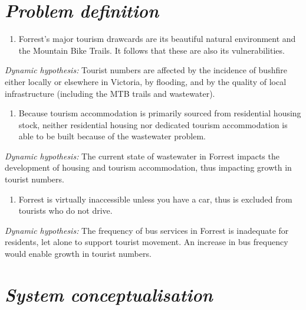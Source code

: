 \documentclass[
  11pt,
]{book}
\providecommand{\tightlist}{%
  \setlength{\itemsep}{0pt}\setlength{\parskip}{0pt}}
\begin{document}
\hypertarget{problem-definition-4}{%
\section{\texorpdfstring{\emph{Problem definition}}{Problem definition}}\label{problem-definition-4}}

\begin{enumerate}
\def\labelenumi{\arabic{enumi}.}
\tightlist
\item
  Forrest's major tourism drawcards are its beautiful natural environment and the Mountain Bike Trails. It follows that these are also its vulnerabilities.
\end{enumerate}

\emph{Dynamic hypothesis:}
Tourist numbers are affected by the incidence of bushfire either locally or elsewhere in Victoria, by flooding, and by the quality of local infrastructure (including the MTB trails and wastewater).

\begin{enumerate}
\def\labelenumi{\arabic{enumi}.}
\setcounter{enumi}{1}
\tightlist
\item
  Because tourism accommodation is primarily sourced from residential housing stock, neither residential housing nor dedicated tourism accommodation is able to be built because of the wastewater problem.
\end{enumerate}

\emph{Dynamic hypothesis:}
The current state of wastewater in Forrest impacts the development of housing and tourism accommodation, thus impacting growth in tourist numbers.

\begin{enumerate}
\def\labelenumi{\arabic{enumi}.}
\setcounter{enumi}{2}
\tightlist
\item
  Forrest is virtually inaccessible unless you have a car, thus is excluded from tourists who do not drive.
\end{enumerate}

\emph{Dynamic hypothesis:}
The frequency of bus services in Forrest is inadequate for residents, let alone to support tourist movement. An increase in bus frequency would enable growth in tourist numbers.

\hypertarget{system-conceptualisation-2}{%
\section{\texorpdfstring{\emph{System conceptualisation}}{System conceptualisation}}\label{system-conceptualisation-2}}
\end{document}
